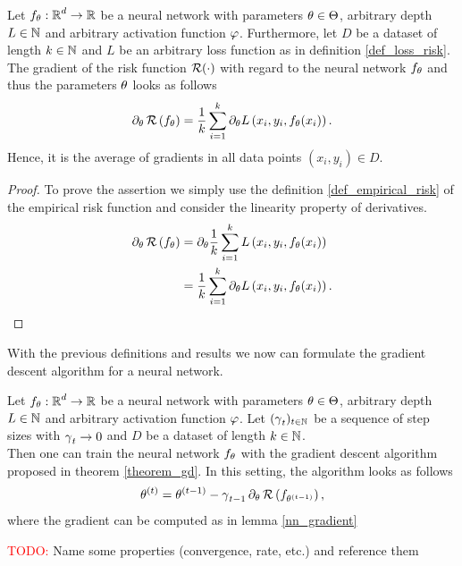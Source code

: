 \begin{lemma}\label{nn_gradient}
Let $f_\theta:\operatorname{\mathbb{R}}^d\to \operatorname{\mathbb{R}}$ be a neural network with parameters $\theta\in\operatorname{\Theta}$, arbitrary depth $L\in\operatorname{\mathbb{N}}$ and arbitrary activation function $\operatorname{\varphi}$. Furthermore, let $D$ be a dataset of length $k\in \operatorname{\mathbb{N}}$ and $L$ be an arbitrary loss function as in definition \ref{def_loss_risk}.\\
The gradient of the risk function $\operatorname{\mathcal{R}}(\cdot)$ with regard to the neural network $f_\theta$ and thus the parameters $\theta$ looks as follows
\begin{align*}
\partial_\theta \operatorname{\mathcal{R}} \left(f_{\theta}\right) = \frac{1}{k} \sum_{i=1}^{k} \partial_\theta L\left(x_i, y_i, f_\theta(x_i)\right).
\end{align*}
Hence, it is the average of gradients in all data points $(x_i,y_i) \in D$.
\end{lemma}


\begin{proof}
To prove the assertion we simply use the definition \ref{def_empirical_risk} of the empirical risk function and consider the linearity property of derivatives.
\begin{align*}
\partial_\theta \operatorname{\mathcal{R}} \left(f_{\theta}\right) &= \partial_\theta \frac{1}{k} \sum_{i=1}^{k} L\left(x_i, y_i, f_\theta(x_i)\right)\\
&= \frac{1}{k} \sum_{i=1}^{k} \partial_\theta L\left(x_i, y_i, f_\theta(x_i)\right).
\end{align*}
\end{proof}


With the previous definitions and results we now can formulate the gradient descent algorithm for a neural network.


\begin{corollary}
Let $f_\theta:\operatorname{\mathbb{R}}^d\to \operatorname{\mathbb{R}}$ be a neural network with parameters $\theta\in\operatorname{\Theta}$, arbitrary depth $L\in\operatorname{\mathbb{N}}$ and arbitrary activation function $\operatorname{\varphi}$. Let $(\operatorname{\gamma}_t)_{t \in \operatorname{\mathbb{N}}}$ be a sequence of step sizes with $\operatorname{\gamma}_t \to 0$ and $D$ be a dataset of length $k\in \operatorname{\mathbb{N}}$.\\
Then one can train the neural network $f_\theta$ with the gradient descent algorithm proposed in theorem \ref{theorem_gd}. In this setting, the algorithm looks as follows
\begin{align*}
\theta^{(t)} = \theta^{(t - 1)} - \operatorname{\gamma}_{t-1} \partial_\theta \operatorname{\mathcal{R}} \left(f_{\theta^{(t -1)}}\right),
\end{align*}
where the gradient can be computed as in lemma \ref{nn_gradient}
\end{corollary}


\textcolor{red}{TODO:} Name some properties (convergence, rate, etc.) and reference them



